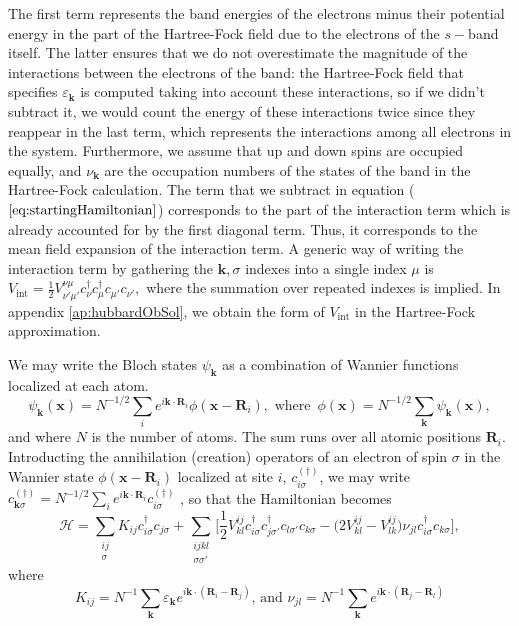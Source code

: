 The first term represents the band energies of the electrons minus their potential energy in the part of the Hartree-Fock field due to the electrons of the $s-$band itself.
The latter ensures that we do not overestimate the magnitude of the interactions between the electrons of the band: the Hartree-Fock field that specifies $\varepsilon_{\bm k}$ is computed taking into account these interactions, so if we didn't subtract it, we would count the energy of these interactions twice since they reappear in the last term, which  represents the interactions among all electrons in the system.
Furthermore, we assume that up and down spins are occupied equally, and $\nu_{\bm k}$ are the occupation numbers of the states of the band in the Hartree-Fock calculation. 
The term that we subtract in equation ($\ref{eq:startingHamiltonian}$) corresponds to the part of the interaction term which is already accounted for by the first diagonal  term.
Thus, it corresponds to the mean field expansion of the interaction term.
A generic way of writing the interaction term by gathering the $\bm k, \sigma$ indexes into a single index $\mu$ is $
V_{\text{int}} = \frac{1}{2} V^{\nu\mu}_{\nu'\mu'} c_\nu^\dagger c_\mu^\dagger c_{\mu'} c_{\nu'} ,
$
where the summation over repeated indexes is implied.
In appendix \ref{ap:hubbardObSol}, we obtain the form of $V_{\text{int}}$ in the Hartree-Fock approximation.

We may write the Bloch states $\psi_{\bm k}$ as a combination of Wannier functions localized at each atom.
\begin{equation}
\psi_{\bm k} (\bm x) = N^{-1/2} \sum_i e^{i \bm k \cdot \bm R_i} \phi (\bm x - \bm R_i), \,\, \text{where} \,\,\, \phi(\bm x) = N^{-1/2} \sum_{\bm k} \psi_{\bm k} (\bm x) , 
\end{equation}
and where $N$ is the number of atoms.
The sum runs over all atomic positions $\bm R_i$. 
Introducting the annihilation (creation) operators of an electron of spin $\sigma$ in the Wannier state $\phi (\bm x - \bm R_i)$ localized at site $i$, $c_{i\sigma}^{(\dagger)}$, we may write $
c_{\bm k \sigma}^{(\dagger)} = N^{-1/2} \sum_i e^{i \bm k \cdot \bm R_i} c_{i\sigma}^{(\dagger)}
$
, so that the Hamiltonian becomes 
\begin{equation}
\mathcal{H} = \sum_{\substack{ i j \\ \sigma} } K_{ij} c_{i \sigma}^\dagger c_{j \sigma} + \sum_{\substack{i j k l \\ \sigma \sigma'} } \bigg[  \frac{1}{2} V^{i j}_{k l}
 c_{i \sigma}^\dagger c_{j \sigma'}^\dagger c_{l \sigma'} c_{ k \sigma} - \bigg( 2 V^{i j}_{k l} - V^{i j} _{l k} \bigg) \nu_{j l} c_{i \sigma}^\dagger c_{ k \sigma} \bigg]  ,
\end{equation}
where
\begin{equation}\label{eq:hopping_matrix}
K_{ij} = N^{-1} \sum_{\bm k} \varepsilon_{\bm k} e^{i \bm k \cdot ( \bm R_i - \bm R_j )}, \, \text{and} \, \, \nu_{j l} = N^{-1} \sum_{\bm k} e^{i \bm k \cdot ( \bm R_j - \bm R_l) }
\end{equation}

